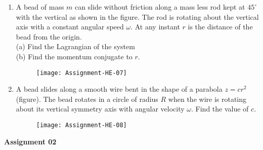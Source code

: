 \begin{enumerate}
	  \begin{tasks}(1)
	 	\task[\textbf{a.}] What is degree of freedom of system
	 	\task[\textbf{b.}] Write down Lagrangian of the system in spherical polar co-ordinate.
	 	\task[\textbf{c.}]Write down Lagranges equation of the system.
	 	\task[\textbf{d.}] Write down Hamiltonian of the system.
	 \end{tasks}
  \begin{figure}[H]
 	\centering
 	\texttt{[image: Assignment-HE-06]}
 \end{figure}
	 \item A bead of mass $m$ can slide without friction along a mass less rod kept at $45^{\circ}$ with the vertical as shown in the figure. The rod is rotating about the vertical axis with a constant angular speed $\omega$. At any instant $r$ is the distance of the bead from the origin.\\
	 (a) Find the Lagrangian of the system\\
	 (b) Find the momentum conjugate to $r$.
	  \begin{figure}[H]
	 	\centering
	 	\texttt{[image: Assignment-HE-07]}
	 \end{figure}
	 \item A bead slides along a smooth wire bent in the shape of a parabola $z=c r^{2}$ (figure). The bead rotates in a circle of radius $R$ when the wire is rotating about its vertical symmetry axis with angular velocity $\omega$. Find the value of $c$.
	  \begin{figure}[H]
	 	\centering
	 	\texttt{[image: Assignment-HE-08]}
	 \end{figure}
\end{enumerate}
\textbf{Assignment 02}
